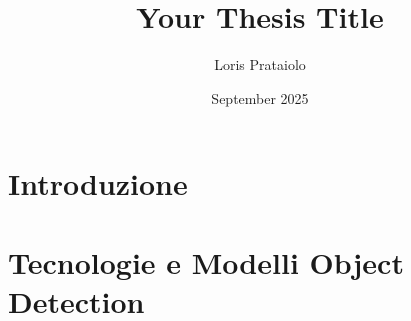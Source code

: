 \documentclass[a4paper,12pt]{report}
\title{Your Thesis Title}
\author{Loris Prataiolo}
\date{September 2025}
\begin{document}







\tableofcontents



\chapter{Introduzione}




\chapter{Tecnologie e Modelli Object Detection}

\end{document}
